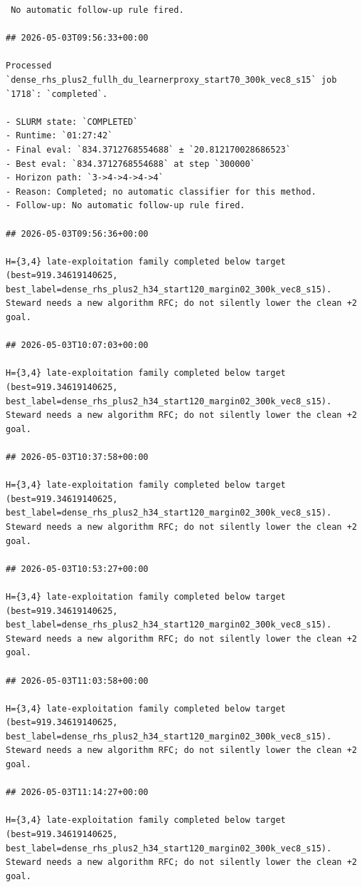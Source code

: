 \begin{verbatim}
 No automatic follow-up rule fired.

## 2026-05-03T09:56:33+00:00

Processed `dense_rhs_plus2_fullh_du_learnerproxy_start70_300k_vec8_s15` job `1718`: `completed`.

- SLURM state: `COMPLETED`
- Runtime: `01:27:42`
- Final eval: `834.3712768554688` ± `20.812170028686523`
- Best eval: `834.3712768554688` at step `300000`
- Horizon path: `3->4->4->4->4`
- Reason: Completed; no automatic classifier for this method.
- Follow-up: No automatic follow-up rule fired.

## 2026-05-03T09:56:36+00:00

H={3,4} late-exploitation family completed below target (best=919.34619140625, best_label=dense_rhs_plus2_h34_start120_margin02_300k_vec8_s15). Steward needs a new algorithm RFC; do not silently lower the clean +2 goal.

## 2026-05-03T10:07:03+00:00

H={3,4} late-exploitation family completed below target (best=919.34619140625, best_label=dense_rhs_plus2_h34_start120_margin02_300k_vec8_s15). Steward needs a new algorithm RFC; do not silently lower the clean +2 goal.

## 2026-05-03T10:37:58+00:00

H={3,4} late-exploitation family completed below target (best=919.34619140625, best_label=dense_rhs_plus2_h34_start120_margin02_300k_vec8_s15). Steward needs a new algorithm RFC; do not silently lower the clean +2 goal.

## 2026-05-03T10:53:27+00:00

H={3,4} late-exploitation family completed below target (best=919.34619140625, best_label=dense_rhs_plus2_h34_start120_margin02_300k_vec8_s15). Steward needs a new algorithm RFC; do not silently lower the clean +2 goal.

## 2026-05-03T11:03:58+00:00

H={3,4} late-exploitation family completed below target (best=919.34619140625, best_label=dense_rhs_plus2_h34_start120_margin02_300k_vec8_s15). Steward needs a new algorithm RFC; do not silently lower the clean +2 goal.

## 2026-05-03T11:14:27+00:00

H={3,4} late-exploitation family completed below target (best=919.34619140625, best_label=dense_rhs_plus2_h34_start120_margin02_300k_vec8_s15). Steward needs a new algorithm RFC; do not silently lower the clean +2 goal.


\end{verbatim}
